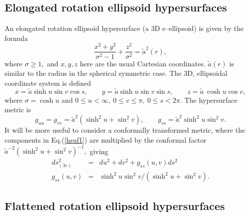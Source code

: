 \documentclass[a4paper,preprint,prabib,aps]{revtex4}
\begin{document}
\subsection{Elongated rotation ellipsoid hypersurfaces}

An elongated rotation ellipsoid hypersurface (a 3D e--ellipsoid) is given by
the formula
\begin{equation}
\frac{x^{2}+y^{2}}{\sigma ^{2}-1}+\frac{z^{2}}{\sigma ^{2}}=\widetilde{a}%
^{2}(r),  \label{relhor}
\end{equation}
where $\sigma \geq 1,$ and $x,y,z$ here are the usual Cartesian coordinates.
$\widetilde{a}(r)$ is similar to the radius in the spherical symmetric case.
The 3D, ellipsoidal coordinate system is defined
\begin{equation}
x=\widetilde{a}\sinh u\sin v\cos s,\qquad y=\widetilde{a}\sinh u\sin v\sin
s,\qquad z=\widetilde{a}\ \cosh u\cos v,
\end{equation}
where $\sigma =\cosh u$ and $0\leq u<\infty ,\ 0\leq v\leq \pi ,\ 0\leq
s<2\pi .$ The hypersurface metric is
\begin{equation}
g_{uu}=g_{vv}=\widetilde{a}^{2}\left( \sinh ^{2}u+\sin ^{2}v\right) ,\qquad
g_{ss}=\widetilde{a}^{2}\sinh ^{2}u\sin ^{2}v.  \label{hsuf1}
\end{equation}
It will be more useful to consider a conformally transformed metric, where
the components in Eq.(\ref{hsuf1}) are multiplied by the conformal factor $%
\widetilde{a}^{-2}\left( \sinh ^{2}u+\sin ^{2}v\right) ^{-1},$ giving
\begin{eqnarray}
ds_{(3e)}^{2} &=&du^{2}+dv^{2}+g_{ss}(u,v)ds^{2}  \label{hsuf1a} \\
g_{ss}(u,v) &=&\sinh ^{2}u\sin ^{2}v/(\sinh ^{2}u+\sin ^{2}v).  \nonumber
\end{eqnarray}

\subsection{Flattened rotation ellipsoid hypersurfaces}
\end{document}
